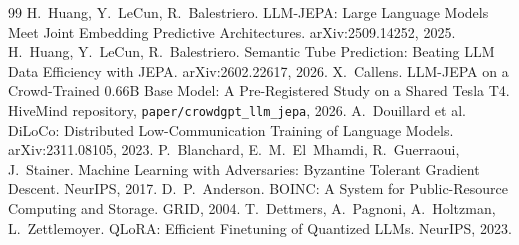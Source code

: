 \documentclass[11pt]{article}
\begin{document}
\begin{thebibliography}{99}
 H.~Huang, Y.~LeCun, R.~Balestriero. LLM-JEPA: Large Language Models Meet Joint Embedding
Predictive Architectures. arXiv:2509.14252, 2025.
 H.~Huang, Y.~LeCun, R.~Balestriero. Semantic Tube Prediction: Beating LLM Data Efficiency with
JEPA. arXiv:2602.22617, 2026.
 X.~Callens. LLM-JEPA on a Crowd-Trained 0.66B Base Model: A Pre-Registered Study on a Shared
Tesla T4. HiveMind repository, \texttt{paper/crowdgpt\_llm\_jepa}, 2026.
 A.~Douillard et al. DiLoCo: Distributed Low-Communication Training of Language Models.
arXiv:2311.08105, 2023.
 P.~Blanchard, E.~M.~El~Mhamdi, R.~Guerraoui, J.~Stainer. Machine Learning with Adversaries:
Byzantine Tolerant Gradient Descent. NeurIPS, 2017.
 D.~P.~Anderson. BOINC: A System for Public-Resource Computing and Storage. GRID, 2004.
 T.~Dettmers, A.~Pagnoni, A.~Holtzman, L.~Zettlemoyer. QLoRA: Efficient Finetuning of
Quantized LLMs. NeurIPS, 2023.
\end{thebibliography}
\end{document}
